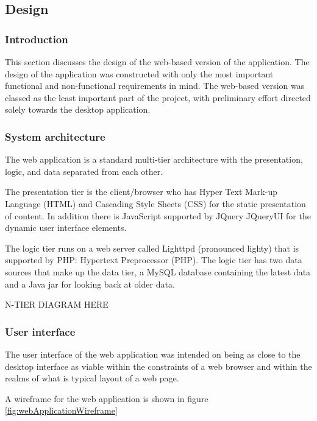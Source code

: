 \subsection{Design}

\subsubsection{Introduction}

This section discusses the design of the web-based version of the application.
The design of the application was constructed with only the most important
functional and non-functional requirements in mind. The web-based version was
classed as the least important part of the project, with preliminary effort
directed solely towards the desktop application.

\subsubsection{System architecture}

The web application is a standard multi-tier architecture with the presentation,
logic, and data separated from each other.

The presentation tier is the client/browser who has Hyper Text Mark-up Language
(HTML) and Cascading Style Sheets (CSS) for the static presentation of content.
In addition there is JavaScript supported by JQuery JQueryUI for the dynamic
user interface elements.

The logic tier runs on a web server called Lighttpd (pronounced lighty) that is
supported by PHP: Hypertext Preprocessor (PHP). The logic tier has two data
sources that make up the data tier, a MySQL database containing the latest data
and a Java jar for looking back at older data.

\label{fig:nTierArchitecture}
N-TIER DIAGRAM HERE%

\subsubsection{User interface}

The user interface of the web application was intended on being as close to the
desktop interface as viable within the constraints of a web browser and within
the realms of what is typical layout of a web page.

A wireframe for the web application is shown in figure
\ref{fig:webApplicationWireframe}

